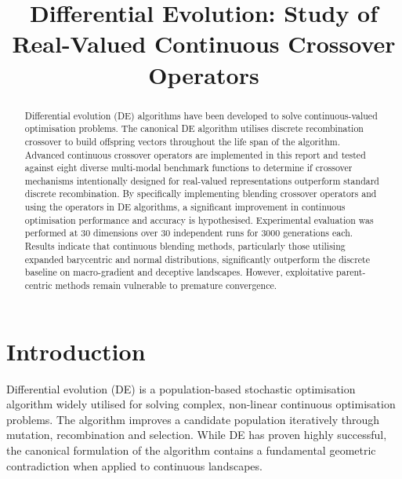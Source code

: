 \documentclass[conference]{IEEEtran}
\begin{document}
\title{Differential Evolution: Study of Real-Valued Continuous Crossover Operators}

\author{
}

\maketitle
\thispagestyle{plain}
\pagestyle{plain}

\begin{abstract}
    Differential evolution (DE) algorithms have been developed to solve continuous-valued optimisation problems. The canonical DE algorithm utilises discrete 
    recombination crossover to build offspring vectors throughout the life span of the algorithm. Advanced continuous crossover operators are implemented in this report 
    and tested against eight diverse multi-modal benchmark functions to determine if crossover mechanisms intentionally designed for  
    real-valued representations outperform standard discrete recombination. By specifically implementing blending crossover operators and using  
    the operators in DE algorithms, a significant improvement in continuous optimisation performance and accuracy is hypothesised. Experimental evaluation was performed 
    at 30 dimensions over 30 independent runs for 3000 generations each. Results indicate that continuous blending methods, particularly those utilising expanded barycentric and normal distributions, significantly outperform the discrete baseline on macro-gradient and deceptive landscapes. However, exploitative  parent-centric methods remain vulnerable to premature convergence.  
\end{abstract}

\section{Introduction}
    
    Differential evolution (DE) \cite{storn1997} is a population-based stochastic optimisation algorithm widely 
    utilised for solving complex, non-linear continuous optimisation problems. The algorithm 
    improves a candidate population iteratively through mutation, recombination and selection. While DE 
    has proven highly successful, the canonical formulation of the algorithm contains a fundamental geometric 
    contradiction when applied to continuous landscapes.
\end{document}

